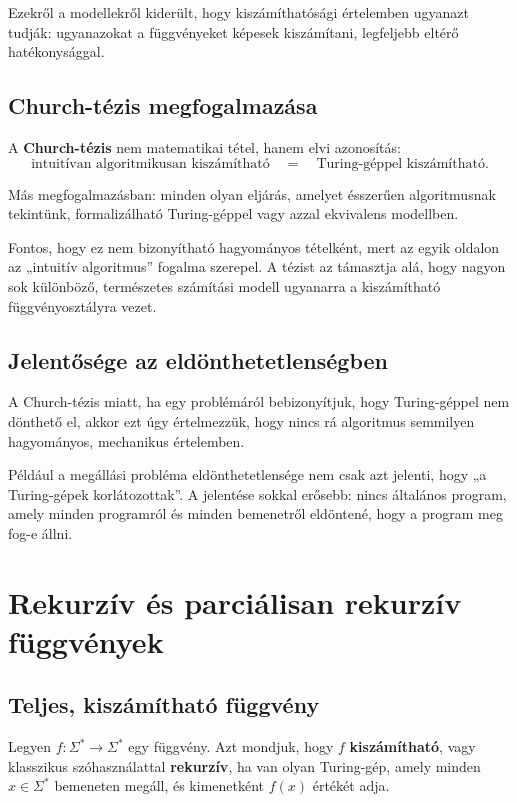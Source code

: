 Ezekről a modellekről kiderült, hogy kiszámíthatósági értelemben ugyanazt tudják: ugyanazokat a függvényeket képesek kiszámítani, legfeljebb eltérő hatékonysággal.

\subsection{Church-tézis megfogalmazása}

A \textbf{Church-tézis} nem matematikai tétel, hanem elvi azonosítás:
\[
  \text{intuitívan algoritmikusan kiszámítható}
  \quad = \quad
  \text{Turing-géppel kiszámítható}.
\]

Más megfogalmazásban: minden olyan eljárás, amelyet ésszerűen algoritmusnak tekintünk, formalizálható Turing-géppel vagy azzal ekvivalens modellben.

Fontos, hogy ez nem bizonyítható hagyományos tételként, mert az egyik oldalon az „intuitív algoritmus” fogalma szerepel. A tézist az támasztja alá, hogy nagyon sok különböző, természetes számítási modell ugyanarra a kiszámítható függvényosztályra vezet.

\subsection{Jelentősége az eldönthetetlenségben}

A Church-tézis miatt, ha egy problémáról bebizonyítjuk, hogy Turing-géppel nem dönthető el, akkor ezt úgy értelmezzük, hogy nincs rá algoritmus semmilyen hagyományos, mechanikus értelemben.

Például a megállási probléma eldönthetetlensége nem csak azt jelenti, hogy „a Turing-gépek korlátozottak”. A jelentése sokkal erősebb: nincs általános program, amely minden programról és minden bemenetről eldöntené, hogy a program meg fog-e állni.

\section{Rekurzív és parciálisan rekurzív függvények}

\subsection{Teljes, kiszámítható függvény}

Legyen $f:\Sigma^*\to\Sigma^*$ egy függvény. Azt mondjuk, hogy $f$ \textbf{kiszámítható}, vagy klasszikus szóhasználattal \textbf{rekurzív}, ha van olyan Turing-gép, amely minden $x\in\Sigma^*$ bemeneten megáll, és kimenetként $f(x)$ értékét adja.

